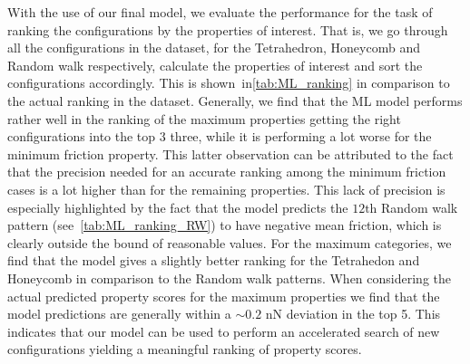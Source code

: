 With the use of our final model, we evaluate the performance for the task of
ranking the configurations by the properties of interest. That is, we go through
all the configurations in the dataset, for the Tetrahedron, Honeycomb and Random
walk respectively, calculate the properties of interest and sort the
configurations accordingly. This is shown~in\cref{tab:ML_ranking} in comparison to the actual
ranking in the dataset. Generally, we find that the \acrshort{ML} model performs
rather well in the ranking of the maximum properties getting the right
configurations into the top 3 three, while it is performing a lot worse for the
minimum friction property. This latter observation can be
attributed to the fact that the precision needed for an accurate ranking among
the minimum friction cases is a lot higher than for the remaining properties. This lack of precision is especially highlighted by the fact that the model predicts the $12\text{th}$ Random walk pattern (see~\cref{tab:ML_ranking_RW}) to have negative mean friction, which is clearly outside the bound of reasonable values. For the maximum categories, we find that the model gives a slightly
better ranking for the Tetrahedon and Honeycomb in comparison to the Random walk
patterns. When considering the actual predicted property scores for the maximum
properties we find that the model predictions are generally within a $\sim 0.2$
nN deviation in the top 5. This indicates that our model can be used to perform
an accelerated search of new configurations yielding a meaningful ranking of
property scores. 


